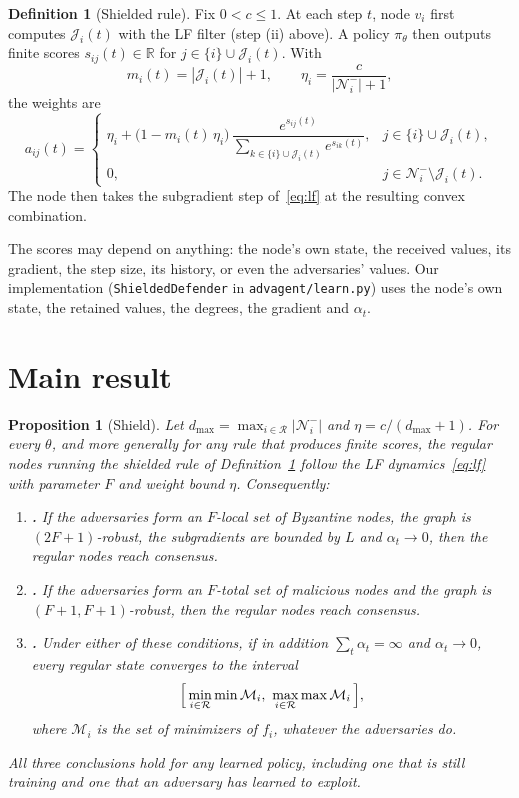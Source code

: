 \documentclass[11pt]{article}
\newtheorem{proposition}{Proposition}
\theoremstyle{definition}
\newtheorem{definition}{Definition}
\theoremstyle{remark}
\newcommand{\Nin}{\mathcal{N}_i^{-}}
\newcommand{\J}{\mathcal{J}_i(t)}
\newcommand{\R}{\mathcal{R}}
\newcommand{\code}[1]{\texttt{#1}}
\begin{document}
\begin{definition}[Shielded rule]\label{def:shield}
Fix $0 < c \le 1$. At each step $t$, node $v_i$ first computes $\J$ with the LF filter (step (ii) above). A policy $\pi_\theta$ then outputs finite scores $s_{ij}(t) \in \mathbb{R}$ for $j \in \{i\} \cup \J$. With
\[
  m_i(t) = |\J| + 1, \qquad \eta_i = \frac{c}{|\Nin| + 1},
\]
the weights are
\begin{equation}\label{eq:floored}
  a_{ij}(t) =
  \begin{cases}
    \eta_i + \bigl(1 - m_i(t)\,\eta_i\bigr)\,\dfrac{e^{s_{ij}(t)}}{\sum_{k \in \{i\}\cup\J} e^{s_{ik}(t)}}, & j \in \{i\} \cup \J,\\[1.2em]
    0, & j \in \Nin \setminus \J.
  \end{cases}
\end{equation}
The node then takes the subgradient step of~\eqref{eq:lf} at the resulting convex combination.
\end{definition}

The scores may depend on anything: the node's own state, the received values, its gradient, the step size, its history, or even the adversaries' values. Our implementation (\code{ShieldedDefender} in \code{advagent/learn.py}) uses the node's own state, the retained values, the degrees, the gradient and $\alpha_t$.

\section{Main result}

\begin{proposition}[Shield]\label{prop:shield}
Let $d_{\max} = \max_{i \in \R} |\Nin|$ and $\eta = c/(d_{\max}+1)$. For every $\theta$, and more generally for any rule that produces finite scores, the regular nodes running the shielded rule of Definition~\ref{def:shield} follow the LF dynamics~\eqref{eq:lf} with parameter $F$ and weight bound $\eta$. Consequently:
\begin{enumerate}[label=(\alph*)]
  \item \textbf{\cite[Thm.~6.1]{sg2019}.} If the adversaries form an $F$-local set of Byzantine nodes, the graph is $(2F+1)$-robust, the subgradients are bounded by $L$ and $\alpha_t \to 0$, then the regular nodes reach consensus.
  \item \textbf{\cite[Thm.~6.4]{sg2019}.} If the adversaries form an $F$-total set of malicious nodes and the graph is $(F+1,F+1)$-robust, then the regular nodes reach consensus.
  \item \textbf{\cite[Thm.~7.1]{sg2019}.} Under either of these conditions, if in addition $\sum_t \alpha_t = \infty$ and $\alpha_t \to 0$, every regular state converges to the interval
  \[
    \Bigl[\, \min_{i \in \R} \min \mathcal{M}_i,\ \max_{i \in \R} \max \mathcal{M}_i \,\Bigr],
  \]
  where $\mathcal{M}_i$ is the set of minimizers of $f_i$, whatever the adversaries do.
\end{enumerate}
All three conclusions hold for any learned policy, including one that is still training and one that an adversary has learned to exploit.
\end{proposition}
\end{document}
